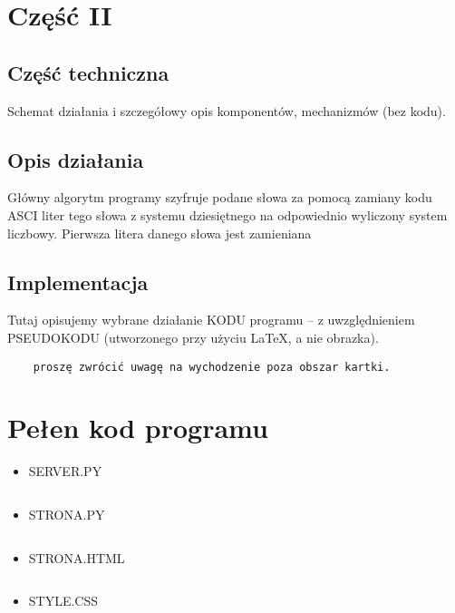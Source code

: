 \documentclass[12pt,a4paper]{article}
\begin{document}
\newpage
	\section*{Część II}
	\subsection*{Część techniczna}
	Schemat działania i szczegółowy opis komponentów, mechanizmów (bez kodu).
	\subsection*{Opis działania} 
	Główny algorytm programy szyfruje podane słowa za pomocą zamiany kodu ASCI liter tego słowa z systemu dziesiętnego na odpowiednio wyliczony system liczbowy. Pierwsza litera danego słowa jest zamieniana 
	\subsection*{Implementacja}
	Tutaj opisujemy wybrane działanie KODU programu -- z uwzględnieniem PSEUDOKODU (utworzonego przy użyciu \LaTeX, a nie obrazka).
	\begin{verbatim}
	proszę zwrócić uwagę na wychodzenie poza obszar kartki.
	\end{verbatim}
	\newpage
	\section*{Pełen kod programu}

	\begin{itemize}
	\item SERVER.PY
	\begin{lstlisting}[language=Python]


	\end{lstlisting}

	\item STRONA.PY
	\begin{lstlisting}[language=Python]

	\end{lstlisting}
	
	\item STRONA.HTML
	\begin{lstlisting}[language=Html]

	\end{lstlisting}
	
	\item STYLE.CSS
	\begin{lstlisting}

	\end{lstlisting}
	\end{itemize}
\end{document}
